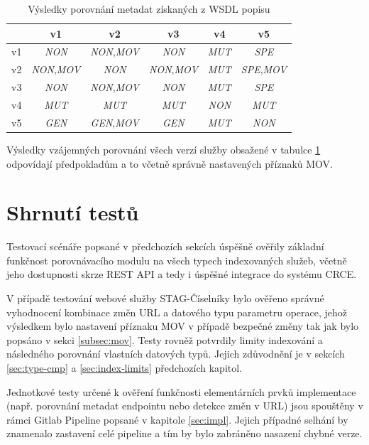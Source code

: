 \documentclass[czech,DP]{thesiskiv}
\begin{document}
\begin{table}[h]
	\centering
	\begin{tabular}{|l||c|c|c|c|c|}
		\hline
		& v1 & v2 & v3 & v4 & v5 \\
		\hline
		\hline
		v1 & \textit{NON} & \textit{NON},\textit{MOV} & \textit{NON} & \textit{MUT} & \textit{SPE} \\
		\hline
		v2 & \textit{NON},\textit{MOV} & \textit{NON} & \textit{NON},\textit{MOV} & \textit{MUT} & \textit{SPE},\textit{MOV} \\
		\hline
		v3 & \textit{NON} & \textit{NON},\textit{MOV} & \textit{NON} & \textit{MUT} & \textit{SPE} \\
		\hline
		v4 & \textit{MUT} & \textit{MUT} & \textit{MUT} & \textit{NON} & \textit{MUT} \\
		\hline
		v5 & \textit{GEN} & \textit{GEN},\textit{MOV} & \textit{GEN} & \textit{MUT} & \textit{NON} \\
		\hline
	\end{tabular}
	\caption{Výsledky porovnání metadat získaných z WSDL popisu}
	\label{tab:stag-wsdl-cmp-res}
\end{table}

Výsledky vzájemných porovnání všech verzí služby obsažené v tabulce \ref{tab:stag-wsdl-cmp-res} odpovídají předpokladům a to včetně správně nastavených příznaků MOV.

\section{Shrnutí testů}

Testovací scénáře popsané v předchozích sekcích úspěšně ověřily základní funkčnost porovnávacího modulu na všech typech indexovaných služeb, včetně jeho dostupnosti skrze REST API a tedy i úspěšné integrace do systému CRCE. 

V případě testování webové služby STAG-Číselníky bylo ověřeno správné vyhodnocení kombinace změn URL a datového typu parametru operace, jehož výsledkem bylo nastavení příznaku MOV v případě bezpečné změny tak jak bylo popsáno v sekci \ref{subsec:mov}. Testy rovněž potvrdily limity indexování a následného porovnání vlastních datových typů. Jejich zdůvodnění je v sekcích \ref{sec:type-cmp} a \ref{sec:index-limits} předchozích kapitol. 

Jednotkové testy určené k ověření funkčnosti elementárních prvků implementace (např. porovnání metadat endpointu nebo detekce změn v URL) jsou spouštěny v rámci Gitlab Pipeline popsané v kapitole \ref{sec:impl}. Jejich případné selhání by znamenalo zastavení celé pipeline a tím by bylo zabráněno nasazení chybné verze.
\end{document}
